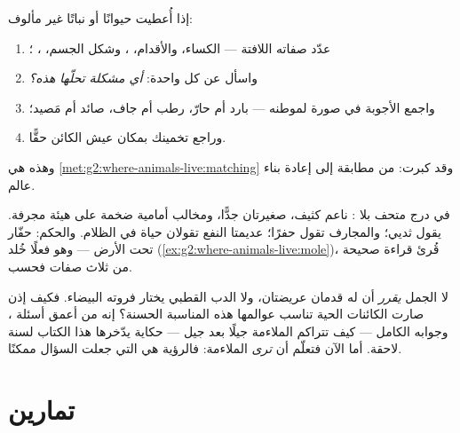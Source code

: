 \begin{method}\label{met:g4:adapted-to-their-world:read}
إذا أُعطيت حيوانًا أو نباتًا غير مألوف:
\begin{enumerate}
  \item عدّد صفاته اللافتة --- الكساء، والأقدام، ، وشكل
        الجسم، ، ؛
  \item واسأل عن كل واحدة: \emph{أي مشكلة تحلّها هذه؟}
  \item واجمع الأجوبة في صورة لموطنه --- بارد أم حارّ، رطب أم جاف،
        صائد أم مَصيد؛
  \item وراجع تخمينك بمكان عيش الكائن حقًّا.
\end{enumerate}
وهذه هي \cref{met:g2:where-animals-live:matching} وقد كبرت: من
مطابقة  إلى إعادة بناء عالم.
\end{method}

\begin{example}\label{ex:g4:adapted-to-their-world:mystery}
في درج متحف  بلا :  ناعم كثيف،  صغيرتان جدًّا،
ومخالب أمامية ضخمة على هيئة مجرفة.  يقول ثديي؛ والمجارف
تقول حفرًا؛  عديمتا النفع تقولان حياة في الظلام. والحكم:
حفّار تحت الأرض --- وهو فعلًا خُلد
(\cref{ex:g2:where-animals-live:mole})، قُرئ قراءة صحيحة من ثلاث
صفات فحسب.
\end{example}

\begin{remark}\label{rem:g4:adapted-to-their-world:how}
لا الجمل \emph{يقرر} أن  له قدمان عريضتان، ولا الدب القطبي
يختار فروته البيضاء. فكيف إذن صارت الكائنات الحية تناسب عوالمها
هذه المناسبة الحسنة؟ إنه من أعمق أسئلة ، وجوابه الكامل
--- كيف تتراكم الملاءمة جيلًا بعد جيل --- حكاية يدّخرها هذا الكتاب
لسنة لاحقة. أما الآن فتعلّم أن \emph{ترى} الملاءمة: فالرؤية هي
التي جعلت السؤال ممكنًا.
\end{remark}

\section{تمارين}

